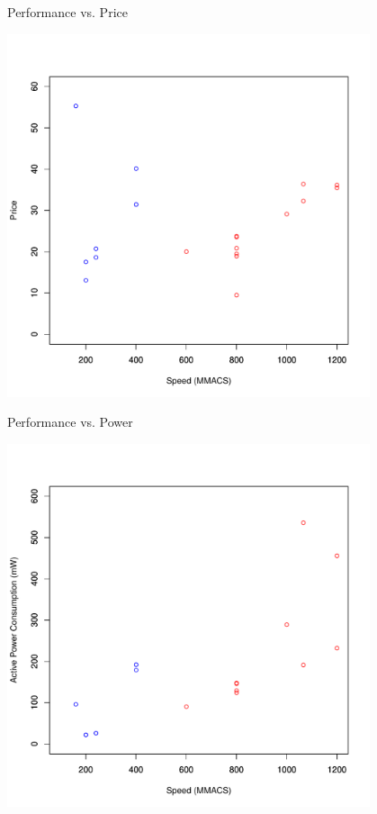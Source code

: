 \documentclass{beamer}
\begin{document}
\begin{frame}{Performance vs. Price}
    \begin{center}
        \includegraphics[width=0.8\textwidth]{price_perf.pdf}
    \end{center}
\end{frame}

\begin{frame}{Performance vs. Power}
    \begin{center}
        \includegraphics[width=0.8\textwidth]{power_perf.pdf}
    \end{center}
\end{frame}
\end{document}
